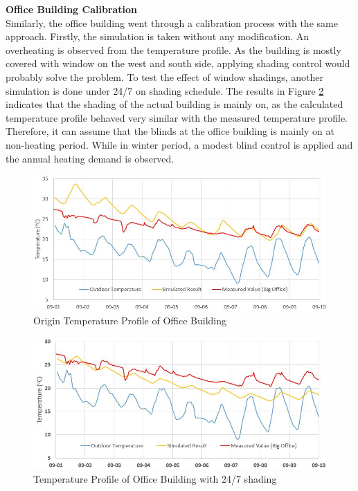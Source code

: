 \documentclass[a4paper, oneside]{discothesis}
\begin{document}
			\textbf{Office Building Calibration}\\
			Similarly, the office building went through a calibration process with the same approach. Firstly, the simulation is taken without any modification. An overheating is observed from the temperature profile. As the building is mostly covered with window on the west and south side, applying shading control would probably solve the problem. To test the effect of window shadings, another simulation is done under 24/7  on shading schedule. The results in Figure \ref{fig:Sumatra_Calibration_Allshade} indicates that the shading of the actual building is mainly on, as the calculated temperature profile behaved very similar with the measured temperature profile. Therefore, it can assume that the blinds at the office building is mainly on at non-heating period. While in winter period, a modest blind control is applied and the annual heating demand is observed.

			\begin{figure}[H]
			\centering
			\includegraphics[scale=0.70]{figures/Office_Calibration_Ori.JPG}
			\caption{Origin Temperature Profile of Office Building}
			\label{fig:Sumatra_Calibration_Ori}
			\end{figure}
			
			\begin{figure}[h!]
			\centering
			\includegraphics[scale=0.7]{Sumatra_Calibration_AllonShading.JPG}
			\caption{Temperature Profile of Office Building with 24/7 shading}
			\label{fig:Sumatra_Calibration_Allshade}
			\end{figure}			
			
\end{document}
